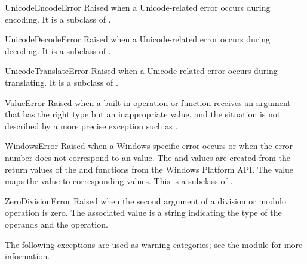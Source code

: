 \begin{excdesc}{UnicodeEncodeError}
  Raised when a Unicode-related error occurs during encoding.  It
  is a subclass of .
\end{excdesc}

\begin{excdesc}{UnicodeDecodeError}
  Raised when a Unicode-related error occurs during decoding.  It
  is a subclass of .
\end{excdesc}

\begin{excdesc}{UnicodeTranslateError}
  Raised when a Unicode-related error occurs during translating.  It
  is a subclass of .
\end{excdesc}

\begin{excdesc}{ValueError}
  Raised when a built-in operation or function receives an argument
  that has the right type but an inappropriate value, and the
  situation is not described by a more precise exception such as
  .
\end{excdesc}

\begin{excdesc}{WindowsError}
  Raised when a Windows-specific error occurs or when the error number
  does not correspond to an  value.  The
   and  values are created from the
  return values of the  and
   functions from the Windows Platform API.
  The  value maps the  value to 
  corresponding  values.
  This is a subclass of .
\end{excdesc}

\begin{excdesc}{ZeroDivisionError}
  Raised when the second argument of a division or modulo operation is
  zero.  The associated value is a string indicating the type of the
  operands and the operation.
\end{excdesc}



The following exceptions are used as warning categories; see the
 module for more information.


